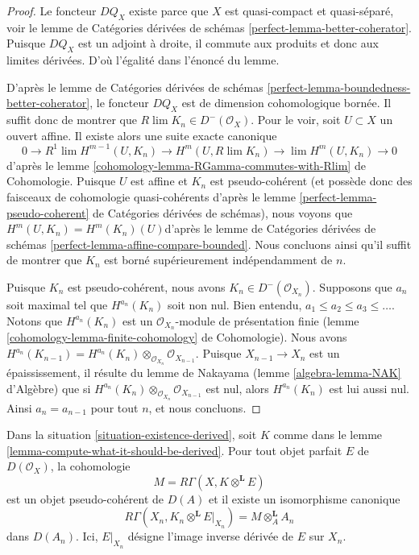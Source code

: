 \begin{proof}
Le foncteur $DQ_X$ existe parce que $X$ est quasi-compact et
quasi-séparé, voir le lemme de Catégories dérivées de schémas
\ref{perfect-lemma-better-coherator}.
Puisque $DQ_X$ est un adjoint à droite, il commute aux produits
et donc aux limites dérivées. D'où l'égalité
dans l'énoncé du lemme.

\medskip\noindent
D'après le lemme de Catégories dérivées de schémas
\ref{perfect-lemma-boundedness-better-coherator},
le foncteur $DQ_X$ est de dimension cohomologique bornée.
Il suffit donc de montrer que $R\lim K_n \in D^-(\mathcal{O}_X)$.
Pour le voir, soit $U \subset X$ un ouvert affine.
Il existe alors une suite exacte canonique
$$
0 \to
R^1\lim H^{m - 1}(U, K_n) \to H^m(U, R\lim K_n) \to
\lim H^m(U, K_n) \to 0
$$
d'après le lemme \ref{cohomology-lemma-RGamma-commutes-with-Rlim} de Cohomologie.
Puisque $U$ est affine et $K_n$ est pseudo-cohérent (et possède donc des
faisceaux de cohomologie quasi-cohérents d'après le lemme
\ref{perfect-lemma-pseudo-coherent} de Catégories dérivées de schémas),
nous voyons que $H^m(U, K_n) = H^m(K_n)(U)$\newline d'après le
lemme de Catégories dérivées de schémas
\ref{perfect-lemma-affine-compare-bounded}.
Nous concluons ainsi qu'il suffit de montrer que $K_n$
est borné supérieurement indépendamment de $n$.

\medskip\noindent
Puisque $K_n$ est pseudo-cohérent, nous avons $K_n \in D^-(\mathcal{O}_{X_n})$.
Supposons que $a_n$ soit maximal tel que $H^{a_n}(K_n)$ soit non nul.
Bien entendu, $a_1 \leq a_2 \leq a_3 \leq \ldots$.
Notons que $H^{a_n}(K_n)$ est un
$\mathcal{O}_{X_n}$-module de présentation finie
(lemme \ref{cohomology-lemma-finite-cohomology} de Cohomologie).
Nous avons $H^{a_n}(K_{n - 1}) =
H^{a_n}(K_n) \otimes_{\mathcal{O}_{X_n}} \mathcal{O}_{X_{n - 1}}$.
Puisque $X_{n - 1} \to X_n$ est un épaississement, il résulte du
lemme de Nakayama (lemme \ref{algebra-lemma-NAK} d'Algèbre) que si
$H^{a_n}(K_n) \otimes_{\mathcal{O}_{X_n}} \mathcal{O}_{X_{n - 1}}$
est nul, alors $H^{a_n}(K_n)$ est lui aussi nul. Ainsi $a_n = a_{n - 1}$
pour tout $n$, et nous concluons.
\end{proof}

\begin{lemma}
\label{lemma-compute-against-perfect-derived}
Dans la situation \ref{situation-existence-derived}, soit $K$ comme dans le
lemme \ref{lemma-compute-what-it-should-be-derived}. Pour tout objet parfait
$E$ de $D(\mathcal{O}_X)$, la cohomologie
$$
M = R\Gamma(X, K \otimes^\mathbf{L} E)
$$
est un objet pseudo-cohérent de $D(A)$ et il existe un isomorphisme canonique
$$
R\Gamma(X_n, K_n \otimes^\mathbf{L} E|_{X_n}) = M \otimes_A^\mathbf{L} A_n
$$
dans $D(A_n)$. Ici, $E|_{X_n}$ désigne l'image inverse dérivée de $E$ sur $X_n$.
\end{lemma}

